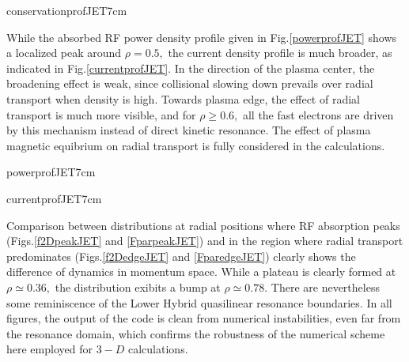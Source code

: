 {conservationprofJET}{7cm} %

While the absorbed RF power density profile given in Fig.\ref{powerprofJET}
shows a localized peak around $\rho =0.5,$ the current density profile is
much broader, as indicated in Fig.\ref{currentprofJET}. In the direction of
the plasma center, the broadening effect is weak, since collisional slowing
down prevails over radial transport when density is high. Towards plasma
edge, the effect of radial transport is much more visible, and for $\rho
\geq 0.6,$ all the fast electrons are driven by this mechanism instead of
direct kinetic resonance. The effect of plasma magnetic equibrium on radial
transport is fully considered in the calculations.

{powerprofJET}{7cm} %

{currentprofJET}{7cm} %

Comparison between distributions at radial positions where RF absorption
peaks (Figs.\ref{f2DpeakJET} and \ref{FparpeakJET}) and in the region where
radial transport predominates (Figs.\ref{f2DedgeJET} and \ref{FparedgeJET})
clearly shows the difference of dynamics in momentum space. While a plateau
is clearly formed at $\rho \simeq 0.36,$ the distribution exibits a bump at $%
\rho \simeq 0.78.$ There are nevertheless some reminiscence of the Lower
Hybrid quasilinear resonance boundaries. In all figures, the output of the
code is clean from numerical instabilities, even far from the resonance
domain, which confirms the robustness of the numerical scheme here employed
for $3-D$ calculations.

